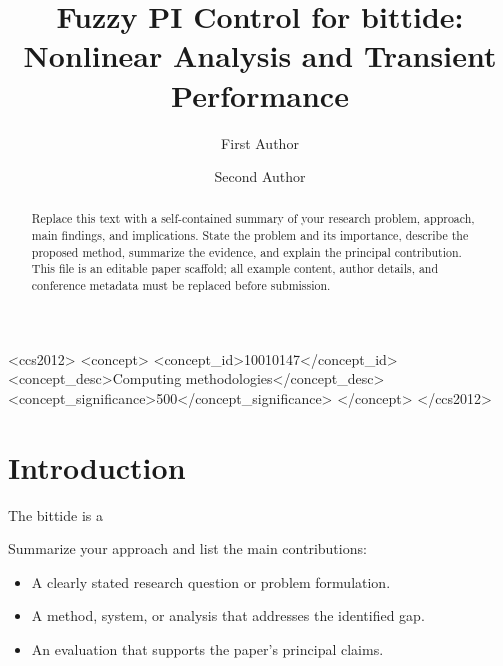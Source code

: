 \documentclass[sigconf]{acmart}
\begin{document}
\title{Fuzzy PI Control for bittide: Nonlinear Analysis and Transient Performance}

\author{First Author}

\author{Second Author}

\renewcommand{\shortauthors}{First Author and Second Author}

\begin{abstract}
Replace this text with a self-contained summary of your research problem,
approach, main findings, and implications. State the problem and its importance,
describe the proposed method, summarize the evidence, and explain the principal
contribution. This file is an editable paper scaffold; all example content,
author details, and conference metadata must be replaced before submission.
\end{abstract}

\begin{CCSXML}
<ccs2012>
 <concept>
  <concept_id>10010147</concept_id>
  <concept_desc>Computing methodologies</concept_desc>
  <concept_significance>500</concept_significance>
 </concept>
</ccs2012>
\end{CCSXML}

\maketitle

\section{Introduction}
The bittide is a 

Summarize your approach and list the main contributions:
\begin{itemize}
  \item A clearly stated research question or problem formulation.
  \item A method, system, or analysis that addresses the identified gap.
  \item An evaluation that supports the paper's principal claims.
\end{itemize}
\end{document}
